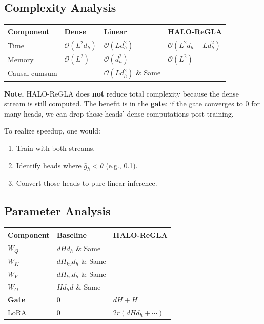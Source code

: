 \subsection{Complexity Analysis}

\begin{table}[H]
\centering
\small
\begin{tabular}{llll}
\toprule
\textbf{Component} & \textbf{Dense} & \textbf{Linear} & \textbf{HALO-ReGLA} \\
\midrule
Time & $\mathcal{O}(L^2 d_h)$ & $\mathcal{O}(L d_h^2)$ & $\mathcal{O}(L^2 d_h + L d_h^2)$ \\
Memory & $\mathcal{O}(L^2)$ & $\mathcal{O}(d_h^2)$ & $\mathcal{O}(L^2)$ \\
Causal cumsum & -- & $\mathcal{O}(L d_h^2)$ \& Same \\
\bottomrule
\end{tabular}
\end{table}

\textbf{Note.} HALO-ReGLA does \textbf{not} reduce total complexity because the dense 
stream is still computed. The benefit is in the \textbf{gate}: if the gate 
converges to 0 for many heads, we can drop those heads' dense computations 
post-training.

To realize speedup, one would:
\begin{enumerate}
\item Train with both streams.
\item Identify heads where $\bar{g}_h < \theta$ (e.g., 0.1).
\item Convert those heads to pure linear inference.

\end{enumerate}
\subsection{Parameter Analysis}

\begin{table}[H]
\centering
\small
\begin{tabular}{lll}
\toprule
\textbf{Component} & \textbf{Baseline} & \textbf{HALO-ReGLA} \\
\midrule
$W_Q$ & $d H d_h$ \& Same \\
$W_K$ & $d H_{kv} d_h$ \& Same \\
$W_V$ & $d H_{kv} d_h$ \& Same \\
$W_O$ & $H d_h d$ \& Same \\
\textbf{Gate} & 0 & $d H + H$ \\
LoRA & 0 & $2 r (d H d_h + \cdots)$ \\
\bottomrule
\end{tabular}
\end{table}

